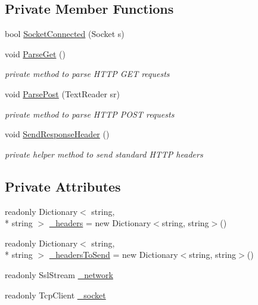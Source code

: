\subsection*{Private Member Functions}
\begin{DoxyCompactItemize}
\item 
bool \hyperlink{class_damp_server_1_1_http_a5f389e760d52203ee9d0966cf9656b4d}{Socket\-Connected} (Socket s)
\item 
void \hyperlink{class_damp_server_1_1_http_a0096cde5120e2e8e2c6eaf1fdba327f0}{Parse\-Get} ()
\begin{DoxyCompactList}\small\item\em private method to parse H\-T\-T\-P G\-E\-T requests \end{DoxyCompactList}\item 
void \hyperlink{class_damp_server_1_1_http_ac95fcecda6280063900b313b250bc3ca}{Parse\-Post} (Text\-Reader sr)
\begin{DoxyCompactList}\small\item\em private method to parse H\-T\-T\-P P\-O\-S\-T requests \end{DoxyCompactList}\item 
void \hyperlink{class_damp_server_1_1_http_a5dd8c388cedb0106c3c4a22b4fccbc54}{Send\-Response\-Header} ()
\begin{DoxyCompactList}\small\item\em private helper method to send standard H\-T\-T\-P headers \end{DoxyCompactList}\end{DoxyCompactItemize}
\subsection*{Private Attributes}
\begin{DoxyCompactItemize}
\item 
readonly Dictionary$<$ string, \\*
string $>$ \hyperlink{class_damp_server_1_1_http_a47b51d508ac52dd59858a1726b350ce5}{\-\_\-headers} = new Dictionary$<$string, string$>$()
\item 
readonly Dictionary$<$ string, \\*
string $>$ \hyperlink{class_damp_server_1_1_http_aee9d41f017dce1a5fd6b1f14ae6f547a}{\-\_\-headers\-To\-Send} = new Dictionary$<$string, string$>$()
\item 
readonly Ssl\-Stream \hyperlink{class_damp_server_1_1_http_a0aa570b59e1abbf1e2ac7efd5645fa50}{\-\_\-network}
\item 
readonly Tcp\-Client \hyperlink{class_damp_server_1_1_http_a71888e437700b492e514a4cbe623d428}{\-\_\-socket}
\end{DoxyCompactItemize}
